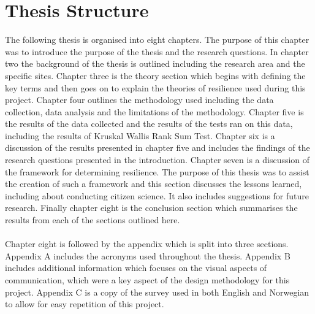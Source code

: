 \section{Thesis Structure}
The following thesis is organised into eight chapters. The purpose of this chapter was to introduce the purpose of the thesis and the research questions. In chapter two the background of the thesis is outlined including the research area and the specific sites. Chapter three is the theory section which begins with defining the key terms and then goes on to explain the theories of resilience used during this project. Chapter four outlines the methodology used including the data collection, data analysis and the limitations of the methodology. Chapter five is the results of the data collected and the results of the tests ran on this data, including the results of Kruskal Wallis Rank Sum Test. Chapter six is a discussion of the results presented in chapter five and includes the findings of the research questions presented in the introduction. Chapter seven is a discussion of the framework for determining resilience. The purpose of this thesis was to assist the creation of such a framework and this section discusses the lessons learned, including about conducting citizen science. It also includes suggestions for future research. Finally chapter eight is the conclusion section which summarises the results from each of the sections outlined here.
\paragraph{}

Chapter eight is followed by the appendix which is split into three sections. Appendix A includes the acronyms used throughout the thesis. Appendix B includes additional information which focuses on the visual aspects of communication, which were a key aspect of the design methodology for this project. Appendix C is a copy of the survey used in both English and Norwegian to allow for easy repetition of this project. 
